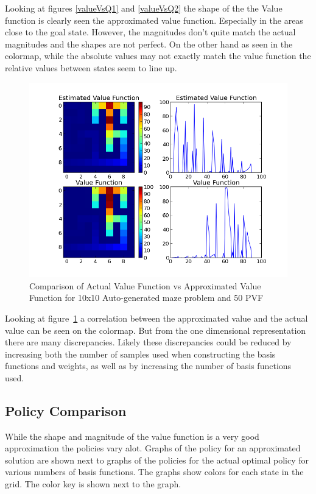 \documentclass[12pt, letterpaper, final]{report}
\begin{document}
Looking at figures \ref{valueVsQ1} and \ref{valueVsQ2} the shape of
the the Value function is clearly seen the approximated value
function. Especially in the areas close to the goal state. However,
the magnitudes don't quite match the actual magnitudes and the shapes
are not perfect. On the other hand as seen in the colormap, while the
absolute values may not exactly match the value function the relative
values between states seem to line up.

\FloatBarrier
\begin{figure}[h!]
\centering
\includegraphics[scale=.5]{images/maze01_V_comparison_k50_s5000.png}
\caption{Comparison of Actual Value Function vs Approximated Value
  Function for 10x10 Auto-generated maze problem and 50 PVF}
\label{valueVsQ3}
\end{figure}
\FloatBarrier

Looking at figure~\ref{valueVsQ3} a correlation between the
approximated value and the actual value can be seen on the
colormap. But from the one dimensional representation there are many
discrepancies. Likely these discrepancies could be reduced by
increasing both the number of samples used when constructing the basis
functions and weights, as well as by increasing the number of basis
functions used.

\subsection*{Policy Comparison}

While the shape and magnitude of the value function is a very good
approximation the policies vary alot. Graphs of the policy for an
approximated solution are shown next to graphs of the policies for the
actual optimal policy for various numbers of basis functions. The graphs show colors for each state in the
grid. The color key is shown next to the graph.
\end{document}
